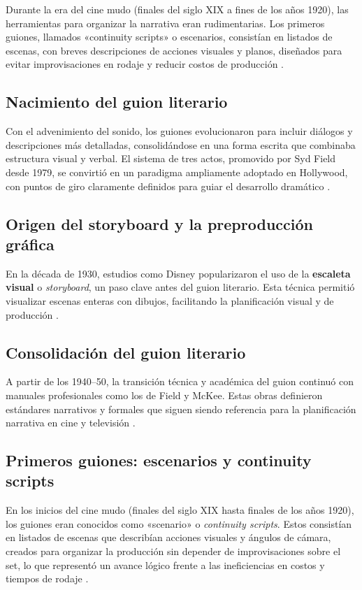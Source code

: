 \documentclass[12pt]{article}
\begin{document}
	Durante la era del cine mudo (finales del siglo XIX a fines de los años 1920), las herramientas para organizar la narrativa eran rudimentarias. Los primeros guiones, llamados «continuity scripts» o escenarios, consistían en listados de escenas, con breves descripciones de acciones visuales y planos, diseñados para evitar improvisaciones en rodaje y reducir costos de producción \parencite{screenplayology_history}.

	\subsection{Nacimiento del guion literario}

	Con el advenimiento del sonido, los guiones evolucionaron para incluir diálogos y descripciones más detalladas, consolidándose en una forma escrita que combinaba estructura visual y verbal. El sistema de tres actos, promovido por Syd Field desde 1979, se convirtió en un paradigma ampliamente adoptado en Hollywood, con puntos de giro claramente definidos para guiar el desarrollo dramático \parencite{newyorker_mckee,newyorker_mckee2}.

	\subsection{Origen del storyboard y la preproducción gráfica}

	En la década de 1930, estudios como Disney popularizaron el uso de la \textbf{escaleta visual} o \textit{storyboard}, un paso clave antes del guion literario. Esta técnica permitió visualizar escenas enteras con dibujos, facilitando la planificación visual y de producción \parencite{storyboard_wikipedia}.

	\subsection{Consolidación del guion literario}

	A partir de los 1940–50, la transición técnica y académica del guion continuó con manuales profesionales como los de Field y McKee. Estas obras definieron estándares narrativos y formales que siguen siendo referencia para la planificación narrativa en cine y televisión \parencite{screenplayology_history,newyorker_mckee}.

	\subsection{Primeros guiones: escenarios y continuity scripts}
	En los inicios del cine mudo (finales del siglo XIX hasta finales de los años 1920), los guiones eran conocidos como «scenario» o \textit{continuity scripts}. Estos consistían en listados de escenas que describían acciones visuales y ángulos de cámara, creados para organizar la producción sin depender de improvisaciones sobre el set, lo que representó un avance lógico frente a las ineficiencias en costos y tiempos de rodaje \parencite{thescriptlab_history,screenplayology_history,wcftr_continuity}.
\end{document}
